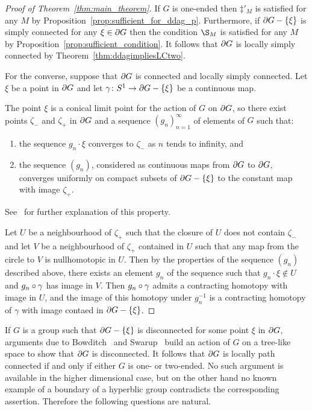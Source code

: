 \documentclass[a4paper]{article}
\begin{document}
\begin{proof}[Proof of Theorem~\ref{thm:main_theorem}]
  If $G$ is one-ended then $\ddag'_M$ is satisfied for any $M$ by
  Proposition~\ref{prop:sufficient_for_ddag_p}. Furthermore, if $\partial G -
  \left\{\xi\right\}$ is simply connected for any $\xi \in \partial G$ then the condition
  $\S_M$ is satisfied for any $M$ by
  Proposition~\ref{prop:sufficient_condition}. It follows that $\partial G$ is
  locally simply connected by Theorem~\ref{thm:ddagimpliesLCtwo}.

  For the converse, suppose that $\partial G$ is connected and locally simply
  connected. Let $\xi$ be a point in $\partial G$ and let $\gamma\colon
  S^1\to\partial G - \left\{\xi\right\}$ be a continuous map. 

  The point $\xi$ is a conical limit point for the action of $G$ on $\partial
  G$, so there exist points $\zeta_-$ and $\zeta_+$ in $\partial G$ and a
  sequence $(g_n)_{n = 1}^\infty$ of elements of $G$ such that:
  \begin{enumerate}
    \item the sequence $g_n\cdot\xi$ converges to $\zeta_-$ as $n$ tends to
      infinity, and
    \item the sequence $(g_n)$, considered as continuous maps from $\partial
      G$ to $\partial G$, converges uniformly on compact subsets of $\partial
      G - \left\{\xi\right\}$ to the constant map with image $\zeta_+$.
  \end{enumerate}
  See~\cite{bowditch99c} for further explanation of this property.

  Let $U$ be a neighbourhood of $\zeta_+$ such that the closure of $U$ does not
  contain $\zeta_-$ and let $V$ be a neighbourhood of $\zeta_+$ contained in
  $U$ such that any map from the circle to $V$ is nullhomotopic in $U$. Then by
  the properties of the sequence $(g_n)$ described above, there exists an
  element $g_n$ of the sequence such that $g_n\cdot\xi \notin U$ and
  $g_n\circ\gamma$ has image in $V$. Then $g_n\circ\gamma$ admits a
  contracting homotopy with image in $U$, and the image of this homotopy under
  $g_n^{-1}$ is a contracting homotopy of $\gamma$ with image contaed in
  $\partial G - \left\{\xi\right\}$.
\end{proof}

If $G$ is a group such that $\partial G - \left\{\xi\right\}$ is disconnected for some
point $\xi$ in $\partial G$, arguments due to Bowditch~\cite{bowditch98b} and
Swarup~\cite{swarup96} build an action of $G$ on a tree-like space to show that
$\partial G$ is disconnected. It follows that $\partial G$ is locally path
connected if and only if either $G$ is one- or two-ended. No such argument is
available in the higher dimensional case, but on the other hand no known
example of a boundary of a hyperblic group contradicts the corresponding
assertion. Therefore the following questions are natural.
\end{document}

